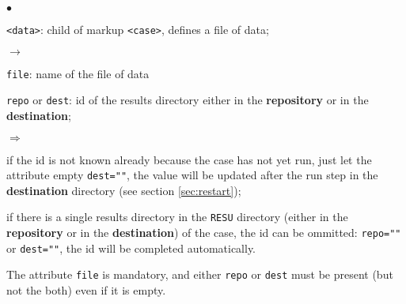 \documentclass[a4paper,10pt,twoside]{article}
\begin{document}
\begin{list}{$\bullet$}{}
\item \texttt{<data>}: child of markup \texttt{<case>}, defines a file of data;
\begin{list}{$\rightarrow$}{}
\item \texttt{file}: name of the file of data
\item \texttt{repo} or \texttt{dest}: id of the results directory either in the
\textbf{repository} or in the \textbf{destination};
\begin{list}{$\Rightarrow$}{}
\item if the id is not known already because the case has not yet run, just let
the attribute empty \texttt{dest=""}, the value will be updated after the run
step in the \textbf{destination} directory (see section \ref{sec:restart});
\item if there is a single results directory in the \texttt{RESU} directory
(either in the \textbf{repository} or in the \textbf{destination}) of the case,
the id can be ommitted: \texttt{repo=""} or \texttt{dest=""}, the id will be
completed automatically.
\end{list}
\end{list}
The attribute \texttt{file} is mandatory, and either \texttt{repo} or
\texttt{dest} must be present (but not the both) even if it is empty.


\end{list}
\end{document}
